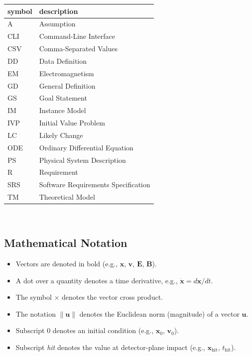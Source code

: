 \documentclass[12pt]{article}
\begin{document}
\renewcommand{\arraystretch}{1.2}
\begin{tabular}{l l}
  \toprule
  \textbf{symbol} & \textbf{description}\\
  \midrule
  A   & Assumption\\
  CLI & Command-Line Interface\\
  CSV & Comma-Separated Values\\
  DD  & Data Definition\\
  EM  & Electromagnetism\\
  GD  & General Definition\\
  GS  & Goal Statement\\
  IM  & Instance Model\\
  IVP & Initial Value Problem\\
  LC  & Likely Change\\
  ODE & Ordinary Differential Equation\\
  PS  & Physical System Description\\
  R   & Requirement\\
  SRS & Software Requirements Specification\\
  TM  & Theoretical Model\\
  \bottomrule
\end{tabular}\\

\subsection{Mathematical Notation}

\begin{itemize}
  \item Vectors are denoted in bold (e.g., $\mathbf{x}$, $\mathbf{v}$, $\mathbf{E}$, $\mathbf{B}$).
  \item A dot over a quantity denotes a time derivative, e.g., $\dot{\mathbf{x}} = d\mathbf{x}/dt$.
  \item The symbol $\times$ denotes the vector cross product.
  \item The notation $\|\mathbf{u}\|$ denotes the Euclidean norm (magnitude) of a vector $\mathbf{u}$.
  \item Subscript $0$ denotes an initial condition (e.g., $\mathbf{x}_0$, $\mathbf{v}_0$).
  \item Subscript \textit{hit} denotes the value at detector-plane impact (e.g., $\mathbf{x}_{\text{hit}}$, $t_{\text{hit}}$).
\end{itemize}
\end{document}
